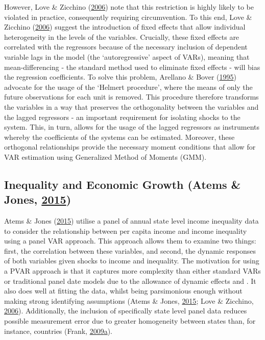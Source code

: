 \documentclass[11pt,preprint, authoryear]{elsarticle}
\numberwithin{equation}{section}
\numberwithin{figure}{section}
\numberwithin{table}{section}
\begin{document}
However, Love \& Zicchino (\protect\hyperlink{ref-love}{2006}) note that
this restriction is highly likely to be violated in practice,
consequently requiring circumvention. To this end, Love \& Zicchino
(\protect\hyperlink{ref-love}{2006}) suggest the introduction of fixed
effects that allow individual heterogeneity in the levels of the
variables. Crucially, these fixed effects are correlated with the
regressors because of the necessary inclusion of dependent variable lags
in the model (the `autoregressive' aspect of VARs), meaning that
mean-differencing - the standard method used to eliminate fixed effects
- will bias the regression coefficients. To solve this problem, Arellano
\& Bover (\protect\hyperlink{ref-arellano}{1995}) advocate for the usage
of the `Helmert procedure', where the means of only the future
observations for each unit is removed. This procedure therefore
transforms the variables in a way that preserves the orthogonality
between the variables and the lagged regressors - an important
requirement for isolating shocks to the system. This, in turn, allows
for the usage of the lagged regressors as instruments whereby the
coefficients of the systems can be estimated. Moreover, these orthogonal
relationships provide the necessary moment conditions that allow for VAR
estimation using Generalized Method of Moments (GMM).

\hypertarget{inequality-and-economic-growth-atems}{%
\subsection{\texorpdfstring{Inequality and Economic Growth (Atems \&
Jones, \protect\hyperlink{ref-atems}{2015})
\label{Section 2.2}}{Inequality and Economic Growth (Atems \& Jones, 2015) }}\label{inequality-and-economic-growth-atems}}

Atems \& Jones (\protect\hyperlink{ref-atems}{2015}) utilise a panel of
annual state level income inequality data to consider the relationship
between per capita income and income inequality using a panel VAR
approach. This approach allows them to examine two things: first, the
correlation between these variables, and second, the dynamic responses
of both variables given shocks to income and inequality. The motivation
for using a PVAR approach is that it captures more complexity than
either standard VARs or traditional panel date models due to the
allowance of dynamic effects and . It also does well at fitting the
data, whilst being parsimonious enough without making strong identifying
assumptions (Atems \& Jones, \protect\hyperlink{ref-atems}{2015}; Love
\& Zicchino, \protect\hyperlink{ref-love}{2006}). Additionally, the
inclusion of specifically state level panel data reduces possible
measurement error due to greater homogeneity between states than, for
instance, countries (Frank,
\protect\hyperlink{ref-frank}{2009}\protect\hyperlink{ref-frank}{a}).
\end{document}
